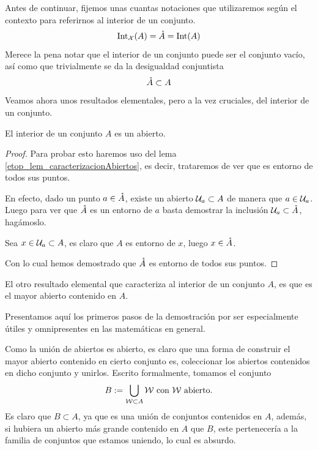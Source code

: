 Antes de continuar, fijemos unas cuantas notaciones que utilizaremos según el contexto para referirnos al interior de un conjunto.
\begin{equation}
\label{etop_eq_notacionInterior}
\operatorname{\mathrm{Int}}_{\mathcal{X}}(A)=\mathring{A}=\operatorname{\mathrm{Int}}(A)
\end{equation}
Merece la pena notar que el interior de un conjunto puede ser el conjunto vacío, así como que trivialmente se da la desigualdad conjuntista
\begin{equation}
\label{etop_eq_desigualdadInterior1}
\mathring{A}\subset A
\end{equation}
Veamos ahora unos resultados elementales, pero a la vez cruciales, del interior de un conjunto.
\begin{lem}
	\label{etop_lem_aperturaInterior}
	El interior de un conjunto $A$ es un abierto.
\end{lem}
\begin{proof}
	Para probar esto haremos uso del lema \ref{etop_lem_caracterizacionAbiertos}, es decir, trataremos de ver que es entorno de todos sus puntos.
	
	En efecto, dado un punto $a\in\mathring{A}$, existe un abierto $\mathcal{U}_a\subset A$ de manera que $a\in\mathcal{U}_a$. Luego para ver que $\mathring{A}$ es un entorno de $a$ basta demostrar la inclusión $\mathcal{U}_a\subset\mathring{A}$, hagámoslo.
	
	Sea $x\in\mathcal{U}_a\subset A$, es claro que $A$ es entorno de $x$, luego $x\in\mathring{A}$.
	
	Con lo cual hemos demostrado que $\mathring{A}$ es entorno de todos sus puntos.
\end{proof}

El otro resultado elemental que caracteriza al interior de un conjunto $A$, es que es el mayor abierto contenido en $A$.

Presentamos aquí los primeros pasos de la demostración por ser especialmente útiles y omnipresentes en las matemáticas en general.

Como la unión de abiertos es abierto, es claro que una forma de construir el mayor abierto contenido en cierto conjunto es, coleccionar los abiertos contenidos en dicho conjunto y unirlos. Escrito formalmente, tomamos el conjunto
\begin{equation}
\label{etop_eq_mayorAbierto}
B:=\bigcup_{\mathcal{W}\subset A}\mathcal{W}\text{ con $\mathcal{W}$ abierto.}
\end{equation}
Es claro que $B\subset A$, ya que es una unión de conjuntos contenidos en $A$, además, si hubiera un abierto más grande contenido en $A$ que $B$, este pertenecería a la familia de conjuntos que estamos uniendo, lo cual es absurdo.

